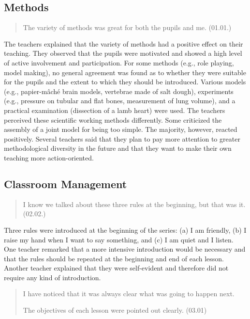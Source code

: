 \documentclass[11.5pt]{sig-alternate} %
\begin{document}
\begin{large}
\subsection*{Methods}

\begin{quote}
    The variety of methods was great for both the pupils and me. (01.01.)
\end{quote}

The teachers explained that the variety of methods had a positive effect on their teaching. They observed that the pupils were motivated and showed a high level of active involvement and participation. For some methods (e.g., role playing, model making), no general agreement was found as to whether they were suitable for the pupils and the extent to which they should be introduced. Various models (e.g., papier-mâché brain models, vertebrae made of salt dough), experiments (e.g., pressure on tubular and flat bones, measurement of lung volume), and a practical examination (dissection of a lamb heart) were used. The teachers perceived these scientific working methods differently. Some criticized the assembly of a joint model for being too simple. The majority, however, reacted positively. Several teachers said that they plan to pay more attention to greater methodological diversity in the future and that they want to make their own teaching more action-oriented.

\subsection*{Classroom Management}

\begin{quote}
    I know we talked about these three rules at the beginning, but that was it. (02.02.)
\end{quote}

Three rules were introduced at the beginning of the series: (a) I am friendly, (b) I raise my hand when I want to say something, and (c) I am quiet and I listen. One teacher remarked that a more intensive introduction would be necessary and that the rules should be repeated at the beginning and end of each lesson. Another teacher explained that they were self-evident and therefore did not require any kind of introduction.

\begin{quote}
    I have noticed that it was always clear what was going to happen next.
    
    The objectives of each lesson were pointed out clearly. (03.01)
\end{quote}


\end{large}
\end{document}
